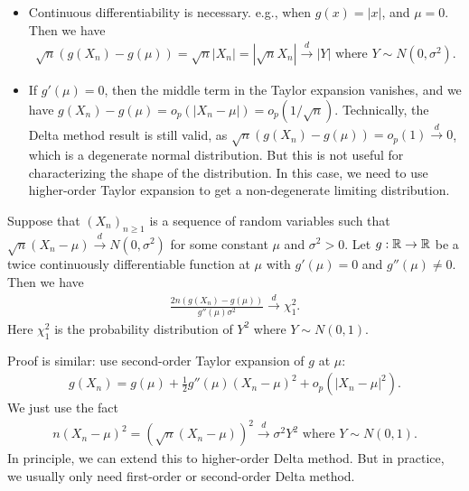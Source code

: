 \documentclass[11pt,letterpaper]{article}
\numberwithin{theorem}{lecture}
\numberwithin{proposition}{lecture}
\numberwithin{lemma}{lecture}
\numberwithin{claim}{lecture}
\numberwithin{corollary}{lecture}
\numberwithin{definition}{lecture}
\numberwithin{conjecture}{lecture}
\numberwithin{remark}{lecture}
\numberwithin{example}{lecture}
\numberwithin{equation}{lecture}
\begin{document}
\begin{itemize}
  \item Continuous differentiability is necessary. e.g., when $g(x) = |x|$, and $\mu = 0$. Then we have
  \begin{align*}
    \sqrt{n} (g(X_n) - g(\mu)) = \sqrt{n} |X_n| = |\sqrt{n} X_n| \xrightarrow{d} |Y| \text{ where } Y \sim N(0, \sigma^2).
  \end{align*}
  \item If $g' (\mu) = 0$, then the middle term in the Taylor expansion vanishes, and we have $g(X_n) - g(\mu) = o_p(|X_n - \mu|) = o_p(1/\sqrt{n})$. Technically, the Delta method result is still valid, as $\sqrt{n} (g(X_n) - g(\mu)) = o_p(1) \xrightarrow{d} 0$, which is a degenerate normal distribution. But this is not useful for characterizing the shape of the distribution. In this case, we need to use higher-order Taylor expansion to get a non-degenerate limiting distribution.
\end{itemize}
\begin{theorem}
  Suppose that $(X_n)_{n \geq 1}$ is a sequence of random variables such that $\sqrt{n}(X_n - \mu) \xrightarrow{d} N(0, \sigma^2)$ for some constant $\mu$ and $\sigma^2 > 0$. Let $g: \mathbb{R} \to \mathbb{R}$ be a twice continuously differentiable function at $\mu$ with $g'(\mu) = 0$ and $g''(\mu) \neq 0$. Then we have
  \begin{align*}
   \frac{2 n (g (X_n) - g (\mu))}{g'' (\mu) \sigma^2} \xrightarrow{d} \chi^2_1.
  \end{align*}
  Here $\chi^2_1$ is the probability distribution of $Y^2$ where $Y \sim N(0,1)$.
\end{theorem}
Proof is similar: use second-order Taylor expansion of $g$ at $\mu$:
\begin{align*}
  g(X_n) = g(\mu) + \frac{1}{2} g''(\mu) (X_n - \mu)^2 + o_p(|X_n - \mu|^2).
\end{align*}
We just use the fact
\begin{align*}
  n (X_n - \mu)^2 = (\sqrt{n} (X_n - \mu))^2 \xrightarrow{d} \sigma^2 Y^2 \text{ where } Y \sim N(0, 1).
\end{align*}
In principle, we can extend this to higher-order Delta method. But in practice, we usually only need first-order or second-order Delta method.
\end{document}
